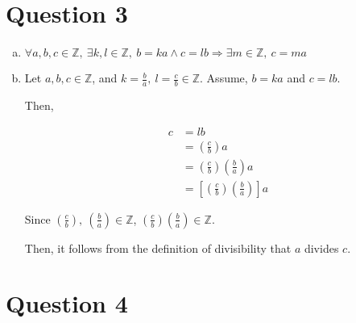 \documentclass[12pt]{article}
\begin{document}
\section*{Question 3}
\begin{enumerate}[a.]
    \item

    $\forall a,b,c \in \mathbb{Z},\:\exists k,l \in \mathbb{Z},\:b = ka \land c = lb
    \Rightarrow \exists m \in \mathbb{Z},\:c = ma$

    \item

    Let $a,b,c \in \mathbb{Z}$, and $k = \frac{b}{a},\:l = \frac{c}{b} \in \mathbb{Z}$.
    Assume, $b = ka$ and $c = lb$.

    \bigskip

    Then,

    \begin{align}
        c &= lb\\
        &= \left( \frac{c}{b} \right) a\\
        &= \left( \frac{c}{b} \right) \left( \frac{b}{a} \right) a\\
        &= \left[ \left( \frac{c}{b} \right) \left( \frac{b}{a} \right) \right] a
    \end{align}

    \bigskip

    Since $\left( \frac{c}{b} \right),\:\left( \frac{b}{a} \right) \in \mathbb{Z}$,
    $\left( \frac{c}{b} \right) \left( \frac{b}{a} \right) \in \mathbb{Z}$.

    \bigskip

    Then, it follows from the definition of divisibility that $a$ divides $c$.

\end{enumerate}

\section*{Question 4}
\end{document}
